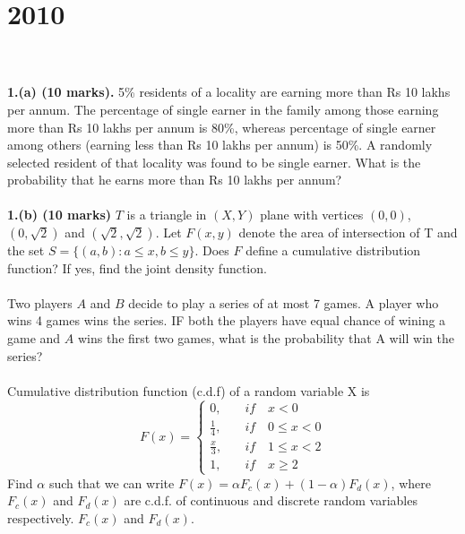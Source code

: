 \section*{2010}
\vspace{-.5cm}
\hrulefill \\\\
\textbf{1.(a) (10 marks).} 5\% residents of a locality are earning more than Rs 10 lakhs per annum. The percentage of single earner in the family among those earning more than Rs 10 lakhs per annum is 80\%, whereas percentage of single earner among others (earning less than Rs 10 lakhs per annum) is 50\%. A randomly selected resident of that locality was found to be single earner. What is the probability that he earns more than Rs 10 lakhs per annum? 
\\\\
\textbf{1.(b) (10 marks)} \(T\) is a triangle in $(X,Y)$ plane with vertices $(0,0)$, $(0,\sqrt{2})$ and $(\sqrt{2}, \sqrt{2})$. Let $F(x,y)$ denote the area of intersection of T and the set $S =\{(a,b): a\leq x,b\leq y\}$. Does $F$ define a cumulative distribution function? If yes, find the joint density function.
\\\\
 Two players $A$ and $B$ decide to play a series of at most 7 games. A player who wins 4 games wins the series. IF both the players have equal chance of wining a game and $A$ wins the first two games, what is the probability that A will win the series? 
\\\\
 Cumulative distribution function (c.d.f) of a random variable X is 
\begin{equation*}
    F(x) = \begin{cases}
             0,\quad &if\quad x<0\\
             \frac{1}{4},\quad &if\quad 0\leq x<0\\
             \frac{x}{3},\quad &if\quad 1\leq x<2\\
             1,\quad &if\quad x\geq 2
    \end{cases}
\end{equation*}
Find $\alpha$ such that we can write $F(x) = \alpha F_c(x) + (1 -\alpha)F_d(x)$, where $F_c(x)$ and $F_d(x)$ are c.d.f. of continuous and discrete random variables respectively. $F_c(x)$ and $F_d(x)$.



